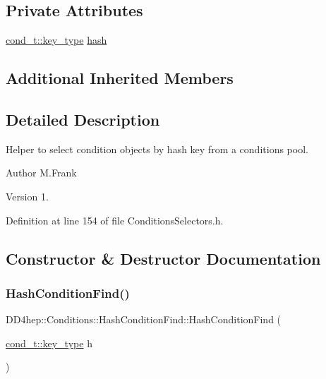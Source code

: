 \subsection*{Private Attributes}
\begin{DoxyCompactItemize}
\item 
\hyperlink{class_d_d4hep_1_1_conditions_1_1_condition_a7528efa762e8cc072ef80ea67c3531f9}{cond\+\_\+t\+::key\+\_\+type} \hyperlink{class_d_d4hep_1_1_conditions_1_1_hash_condition_find_a9be86da61865f479161109ec62efa26a}{hash}
\end{DoxyCompactItemize}
\subsection*{Additional Inherited Members}


\subsection{Detailed Description}
Helper to select condition objects by hash key from a conditions pool. 

\begin{DoxyAuthor}{Author}
M.\+Frank 
\end{DoxyAuthor}
\begin{DoxyVersion}{Version}
1. 
\end{DoxyVersion}


Definition at line 154 of file Conditions\+Selectors.\+h.



\subsection{Constructor \& Destructor Documentation}
\hypertarget{class_d_d4hep_1_1_conditions_1_1_hash_condition_find_a3fd89cf5e4783fb24a05436db39274ff}{}\label{class_d_d4hep_1_1_conditions_1_1_hash_condition_find_a3fd89cf5e4783fb24a05436db39274ff} 
\subsubsection{\texorpdfstring{Hash\+Condition\+Find()}{HashConditionFind()}}
{\footnotesize\ttfamily D\+D4hep\+::\+Conditions\+::\+Hash\+Condition\+Find\+::\+Hash\+Condition\+Find (\begin{DoxyParamCaption}\item[{\hyperlink{class_d_d4hep_1_1_conditions_1_1_condition_a7528efa762e8cc072ef80ea67c3531f9}{cond\+\_\+t\+::key\+\_\+type}}]{h }\end{DoxyParamCaption})\hspace{0.3cm}{\ttfamily [inline]}}



